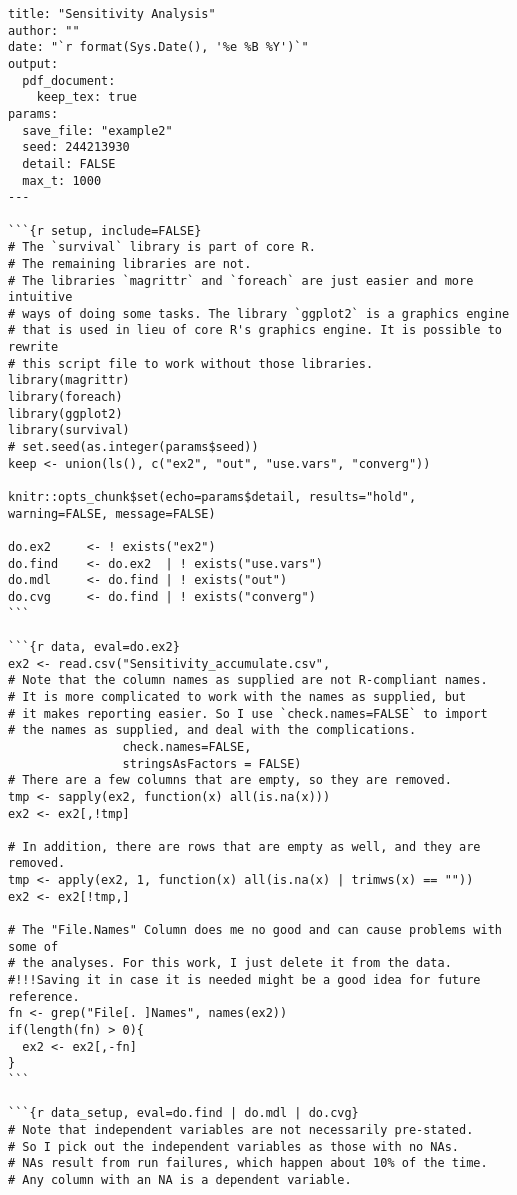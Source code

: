 \begin{lstlisting}[basicstyle=\scriptsize]
title: "Sensitivity Analysis"
author: ""
date: "`r format(Sys.Date(), '%e %B %Y')`"
output:
  pdf_document:
    keep_tex: true
params:
  save_file: "example2"
  seed: 244213930
  detail: FALSE
  max_t: 1000
---

```{r setup, include=FALSE}
# The `survival` library is part of core R.
# The remaining libraries are not.
# The libraries `magrittr` and `foreach` are just easier and more intuitive
# ways of doing some tasks. The library `ggplot2` is a graphics engine
# that is used in lieu of core R's graphics engine. It is possible to rewrite
# this script file to work without those libraries.
library(magrittr)
library(foreach)
library(ggplot2)
library(survival)
# set.seed(as.integer(params$seed))
keep <- union(ls(), c("ex2", "out", "use.vars", "converg"))

knitr::opts_chunk$set(echo=params$detail, results="hold", warning=FALSE, message=FALSE)

do.ex2     <- ! exists("ex2")
do.find    <- do.ex2  | ! exists("use.vars")
do.mdl     <- do.find | ! exists("out")
do.cvg     <- do.find | ! exists("converg")
```

```{r data, eval=do.ex2}
ex2 <- read.csv("Sensitivity_accumulate.csv",
# Note that the column names as supplied are not R-compliant names.
# It is more complicated to work with the names as supplied, but
# it makes reporting easier. So I use `check.names=FALSE` to import
# the names as supplied, and deal with the complications.
                check.names=FALSE,
                stringsAsFactors = FALSE)
# There are a few columns that are empty, so they are removed.
tmp <- sapply(ex2, function(x) all(is.na(x)))
ex2 <- ex2[,!tmp]

# In addition, there are rows that are empty as well, and they are removed.
tmp <- apply(ex2, 1, function(x) all(is.na(x) | trimws(x) == ""))
ex2 <- ex2[!tmp,]

# The "File.Names" Column does me no good and can cause problems with some of
# the analyses. For this work, I just delete it from the data.
#!!!Saving it in case it is needed might be a good idea for future reference.
fn <- grep("File[. ]Names", names(ex2))
if(length(fn) > 0){
  ex2 <- ex2[,-fn]
}
```

```{r data_setup, eval=do.find | do.mdl | do.cvg}
# Note that independent variables are not necessarily pre-stated.
# So I pick out the independent variables as those with no NAs.
# NAs result from run failures, which happen about 10% of the time.
# Any column with an NA is a dependent variable.


\end{lstlisting}
